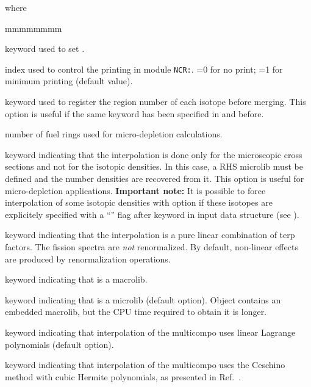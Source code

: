 \noindent where
\begin{ListeDeDescription}{mmmmmmmm}

\item[\moc{EDIT}] keyword used to set .

\item[\dusa{iprint}] index used to control the printing in module {\tt NCR:}. =0 for no print; =1 for minimum printing (default value).

\item[\moc{ALLX}] keyword used to register the region number of each isotope before merging. This option is useful if the same keyword has been specified in  and  before.

\item[\dusa{nbfuel}] number of fuel rings used for micro-depletion calculations.

\item[\moc{RES}] keyword indicating that the interpolation is done only for the microscopic cross sections and not for the isotopic densities. In this case, a RHS {\sc microlib} must be defined and the number densities are recovered from it. This option is useful for micro-depletion applications. {\bf Important note:} It is possible to force interpolation of some isotopic densities with  option if these
isotopes are explicitely specified with a ``\moc{*}'' flag after  keyword in  input data structure (see ).

\item[\moc{PURE}] keyword indicating that the interpolation is a pure linear combination of terp factors. The fission spectra are {\sl not}
renormalized. By default, non-linear effects are produced by renormalization operations.

\item[\moc{MACRO}] keyword indicating that  is a {\sc macrolib}.

\item[\moc{MICRO}] keyword indicating that  is a {\sc microlib} (default option). Object  contains an embedded {\sc macrolib}, but the CPU time required to obtain it is longer.

\item[\moc{LINEAR}] keyword indicating that interpolation of the {\sc multicompo} uses linear Lagrange polynomials (default option).

\item[\moc{CUBIC}] keyword indicating that interpolation of the {\sc multicompo} uses the Ceschino method
with cubic Hermite polynomials, as presented in Ref.~.


\end{ListeDeDescription}
